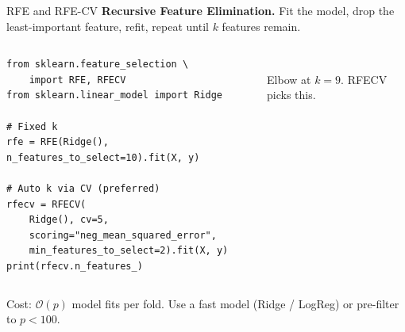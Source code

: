 \documentclass[aspectratio=169]{beamer}
\begin{document}
\begin{frame}[fragile]{RFE and RFE-CV}
  \textbf{Recursive Feature Elimination.} Fit the model, drop the least-important feature, refit, repeat until $k$ features remain.
  \vfill
  \begin{columns}[T]
{\lstset{basicstyle=\ttfamily\scriptsize}
\begin{lstlisting}
from sklearn.feature_selection \
    import RFE, RFECV
from sklearn.linear_model import Ridge

# Fixed k
rfe = RFE(Ridge(), n_features_to_select=10).fit(X, y)

# Auto k via CV (preferred)
rfecv = RFECV(
    Ridge(), cv=5,
    scoring="neg_mean_squared_error",
    min_features_to_select=2).fit(X, y)
print(rfecv.n_features_)
\end{lstlisting}}
    \begin{center}
      \\
      \scriptsize Elbow at $k = 9$. RFECV picks this.
    \end{center}
  \end{columns}
  \vfill
  \footnotesize Cost: $\mathcal{O}(p)$ model fits per fold. Use a fast model (Ridge / LogReg) or pre-filter to $p < 100$.
\end{frame}
\end{document}
